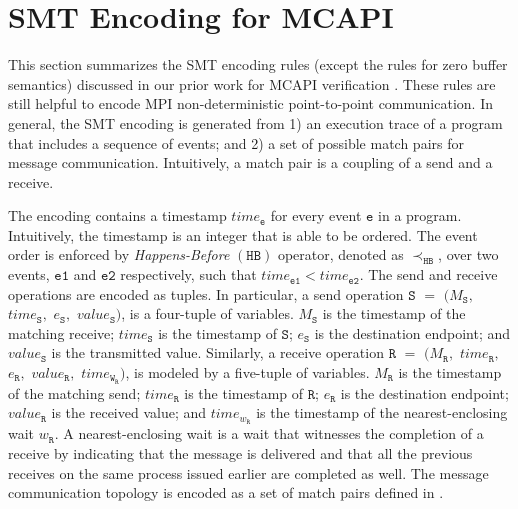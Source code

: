 \section{SMT Encoding for MCAPI}
This section summarizes the SMT encoding rules (except the rules for zero buffer semantics) discussed in our prior work for MCAPI verification \cite{DBLP:conf/kbse/HuangMM13}. These rules are still helpful to encode MPI non-deterministic point-to-point communication. In general, the SMT encoding is generated from 1) an execution trace of a program that includes a sequence of events; and 2) a set of possible match pairs for message communication. Intuitively, a match pair is a coupling of a send and a receive. 


The encoding contains a timestamp $\mathit{time}_\mathtt{e}$ for every event $\mathtt{e}$ in a program. Intuitively, the timestamp is an integer that is able to be ordered.  The event order is enforced by \emph{Happens-Before} $(\mathtt{HB})$ operator, denoted as
$\mathrm{\prec_\mathtt{HB}}$, over two events, $\mathtt{e1}$ and $\mathtt{e2}$ respectively, such that $\mathit{time}_\mathtt{e1} <  \mathit{time}_\mathtt{e2}$. The send and receive operations are encoded as tuples. In particular, a send operation $\mathtt{S}$ $=$ $(M_\mathtt{S},$ $\mathit{time}_\mathtt{S},$ $e_\mathtt{S},$ $\mathit{value}_\mathtt{S})$, is a four-tuple of variables. $M_\mathtt{S}$ is the timestamp of the matching receive; $\mathit{time}_\mathtt{S}$ is the timestamp of $\mathtt{S}$; $e_\mathtt{S}$ is the destination endpoint; and $\mathit{value}_\mathtt{S}$ is the transmitted value. Similarly, a receive operation $\mathtt{R}$ $=$ $(M_\mathtt{R},$ $\mathit{time}_\mathtt{R},$ $e_\mathtt{R},$ $\mathit{value}_\mathtt{R},$ $\mathit{time}_{\mathtt{W}_\mathtt{R}})$, is modeled by a five-tuple of variables. $M_\mathtt{R}$ is the timestamp of the matching send; $\mathit{time}_\mathtt{R}$ is the timestamp of $\mathtt{R}$; $e_\mathtt{R}$ is the destination endpoint; $\mathit{value}_\mathtt{R}$ is the received value; and $\mathit{time}_{\mathit{w}_\mathtt{R}}$ is the timestamp of the nearest-enclosing wait ${\mathit{w}_\mathtt{R}}$. A nearest-enclosing wait is a wait that witnesses the completion of a receive by indicating that the message is delivered and that all the previous receives on the same process issued earlier are completed as well. The message communication topology is encoded as a set of match pairs defined in .

